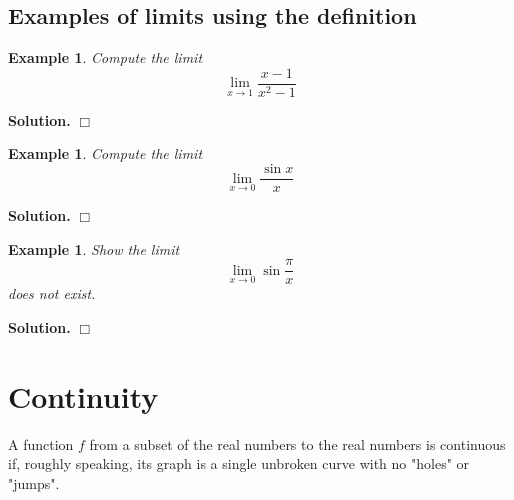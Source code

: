 \documentclass[12pt]{book}
\renewcommand{\optionalDisplay}[1]{}
\newenvironment{solution}{\medskip\noindent\textbf{Solution.} }{$\Box$}
\newtheorem{example}[theorem]{Example}
\begin{document}
\subsection{Examples of limits using the definition}
\begin{example}
Compute the limit
\[\lim\limits_{x\to 1}\frac{x-1}{x^2-1}\]
\end{example}
\begin{solution}
\optionalDisplay{
\psset{xunit=1cm,yunit=1cm}
\begin{pspicture}(-0.5,-0.5)(2,2.5)
\psframe*[linecolor=white](-0.5, -0.5)(2, 2.5)
\tiny
\psaxes[Dy=0.5, labels=none]{<->}(0,0)(-0.5,-0.5)(2,2.5)
\fcYTickWithLabel{0.5}{$0.5$}
\fcXTickWithLabel{1}{$1$}
\psplot[linecolor=red]{-0.5}{2}{1 1 x add div}
\fcHollowDot{1}{0.5}
\end{pspicture}
}%
\end{solution}
\begin{example}
Compute the limit
\[\lim\limits_{x\to 0}\frac{\sin x}{x}\]
\end{example}
\begin{solution}
\optionalDisplay{
\psset{xunit=1cm,yunit=1cm}
\begin{pspicture}(-2,-0.5)(2.2,1.5)
\psframe*[linecolor=white](-2, -0.5)(2.2, 1.7)
\tiny
\fcAxesStandard{-2}{-0.5}{2}{1.5}
\rput[br](-0.1,1.1){ $1$}
\psplot[linecolor=red]{-2}{2}{ x 57.295779513 mul sin x div}
\fcHollowDot{0}{1}
\end{pspicture}
}%
\end{solution}
\begin{example}
Show the limit
\[
\lim\limits_{x\to 0}\sin \frac{\pi}{x}
\]
does not exist.
\end{example}
\begin{solution}
\optionalDisplay{
\begin{pspicture}(-3,-1.5)(3,1.5)
\psframe*[linecolor=white](-3, -1.5)(3.2, 1.7)
\fcAxesStandard{-3}{-1.5}{3}{1.5}
\tiny
\rput[t](1,-0.1){ $1$}
\psplot[linewidth=0.3pt, linecolor=red, plotpoints=10000]{-3}{-0.01}{3.14159 x div 57.295779513 mul sin}
\psplot[linewidth=0.1pt, linecolor=red, plotpoints=10000]{0.01}{3}{3.14159 x div 57.295779513 mul sin}
\end{pspicture}
}%
\end{solution}
\section{Continuity}
A function $f$ from a subset of the real numbers to the real numbers is continuous if, roughly speaking, its graph is a single unbroken curve with no "holes" or "jumps". %
\end{document}
